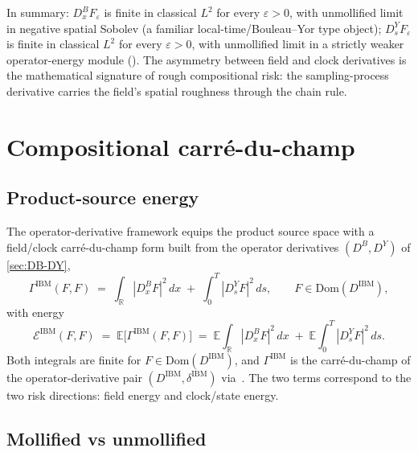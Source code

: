 \documentclass[11pt,reqno]{amsart}
\theoremstyle{plain}
\theoremstyle{definition}
\theoremstyle{remark}
\newcommand{\R}{\mathbb R}
\newcommand{\E}{\mathbb E}
\newcommand{\cE}{\mathcal E}
\newcommand{\Bvar}{B}
\newcommand{\Yclock}{Y}
\begin{document}
In summary: $D^{\Bvar}_{x}F_{\varepsilon}$ is finite in
classical $L^{2}$ for every $\varepsilon>0$, with unmollified
limit in negative spatial Sobolev (a familiar
local-time/Bouleau--Yor type object);
$D^{\Yclock}_{s}F_{\varepsilon}$ is finite in classical $L^{2}$
for every $\varepsilon>0$, with unmollified limit in a strictly
weaker operator-energy module
(\cite{EnergyFirst,FCDC,BidegreeAtlas}). The asymmetry between
field and clock derivatives is the mathematical signature of
rough compositional risk: the sampling-process derivative
carries the field's spatial roughness through the chain rule.

\section{Compositional carr\'e-du-champ}\label{sec:carre}

\subsection{Product-source energy}\label{sec:carre-energy}

The operator-derivative framework equips the product source
space with a field/clock carr\'e-du-champ form built from the
operator derivatives $(D^{\Bvar},D^{\Yclock})$ of
\cref{sec:DB-DY},
\begin{equation}\label{eq:Gamma-IBM}
  \Gamma^{\mathrm{IBM}}(F,F)
   \;=\;\int_{\R}|D^{\Bvar}_{x}F|^{2}\,dx
       \;+\;\int_{0}^{T}|D^{\Yclock}_{s}F|^{2}\,ds,
   \qquad F\in\mathrm{Dom}(D^{\mathrm{IBM}}),
\end{equation}
with energy
\begin{equation}\label{eq:E-IBM}
  \cE^{\mathrm{IBM}}(F,F)\;=\;\E\bigl[\Gamma^{\mathrm{IBM}}(F,F)\bigr]
   \;=\;\E\!\int_{\R}|D^{\Bvar}_{x}F|^{2}\,dx
        \;+\;\E\!\int_{0}^{T}|D^{\Yclock}_{s}F|^{2}\,ds.
\end{equation}
Both integrals are finite for $F\in\mathrm{Dom}(D^{\mathrm{IBM}})$,
and $\Gamma^{\mathrm{IBM}}$ is the carr\'e-du-champ of the
operator-derivative pair $(D^{\mathrm{IBM}},\delta^{\mathrm{IBM}})$
via~\cite[Eq.~(7.5)]{OperatorClarkOcone}. The two terms
correspond to the two risk directions: field energy and
clock/state energy.

\subsection{Mollified vs unmollified}\label{sec:carre-moll}
\end{document}
